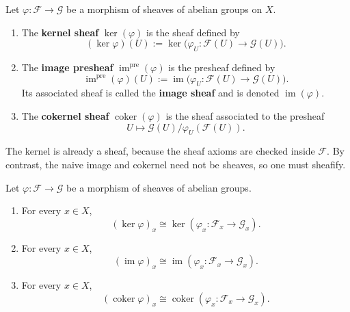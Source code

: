 \documentclass[12pt]{article}
\begin{document}
\begin{definition}
    Let $\varphi : \mathcal F \to \mathcal G$ be a morphism of sheaves of abelian groups on $X$.

    \begin{enumerate}
        \item The \textbf{kernel sheaf} $\ker(\varphi)$ is the sheaf defined by
              \[
                  (\ker \varphi)(U) := \ker\bigl(\varphi_U : \mathcal F(U) \to \mathcal G(U)\bigr).
              \]

        \item The \textbf{image presheaf} $\operatorname{im}^{\mathrm{pre}}(\varphi)$ is the presheaf defined by
              \[
                  \operatorname{im}^{\mathrm{pre}}(\varphi)(U) := \operatorname{im}\bigl(\varphi_U : \mathcal F(U) \to \mathcal G(U)\bigr).
              \]
              Its associated sheaf is called the \textbf{image sheaf} and is denoted $\operatorname{im}(\varphi)$.

        \item The \textbf{cokernel sheaf} $\operatorname{coker}(\varphi)$ is the sheaf associated to the presheaf
              \[
                  U \longmapsto \mathcal G(U) / \varphi_U(\mathcal F(U)).
              \]
    \end{enumerate}
\end{definition}

\begin{remark}
    The kernel is already a sheaf, because the sheaf axioms are checked inside $\mathcal F$. By contrast, the naive image and cokernel need not be sheaves, so one must sheafify.
\end{remark}

\begin{proposition}
    Let $\varphi : \mathcal F \to \mathcal G$ be a morphism of sheaves of abelian groups.

    \begin{enumerate}
        \item For every $x \in X$,
              \[
                  (\ker \varphi)_x \cong \ker(\varphi_x : \mathcal F_x \to \mathcal G_x).
              \]

        \item For every $x \in X$,
              \[
                  (\operatorname{im}\varphi)_x \cong \operatorname{im}(\varphi_x : \mathcal F_x \to \mathcal G_x).
              \]

        \item For every $x \in X$,
              \[
                  (\operatorname{coker}\varphi)_x \cong \operatorname{coker}(\varphi_x : \mathcal F_x \to \mathcal G_x).
              \]
    \end{enumerate}
\end{proposition}
\end{document}
